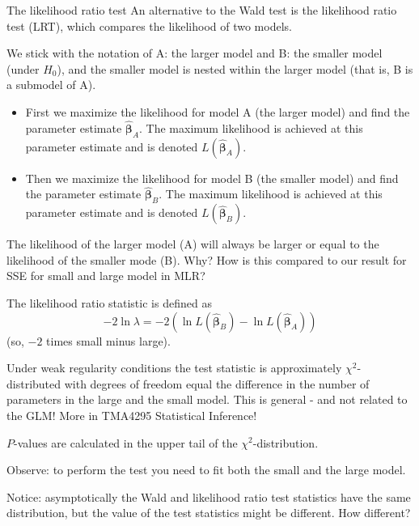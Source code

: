 \documentclass[
  ignorenonframetext,
]{beamer}
\providecommand{\tightlist}{%
  \setlength{\itemsep}{0pt}\setlength{\parskip}{0pt}}
\begin{document}
\begin{frame}
\begin{block}{The likelihood ratio test}
\protect\hypertarget{the-likelihood-ratio-test}{}
An alternative to the Wald test is the likelihood ratio test (LRT),
which compares the likelihood of two models.

We stick with the notation of A: the larger model and B: the smaller
model (under \(H_0\)), and the smaller model is nested within the larger
model (that is, B is a submodel of A).

\begin{itemize}
\tightlist
\item
  First we maximize the likelihood for model A (the larger model) and
  find the parameter estimate \(\hat{\boldsymbol{\beta}}_A\). The
  maximum likelihood is achieved at this parameter estimate and is
  denoted \(L(\hat{\boldsymbol{\beta}}_A)\).
\item
  Then we maximize the likelihood for model B (the smaller model) and
  find the parameter estimate \(\hat{\boldsymbol{\beta}}_B\). The
  maximum likelihood is achieved at this parameter estimate and is
  denoted \(L(\hat{\boldsymbol{\beta}}_B)\).
\end{itemize}
\end{block}
\end{frame}

\begin{frame}
The likelihood of the larger model (A) will always be larger or equal to
the likelihood of the smaller mode (B). Why? How is this compared to our
result for SSE for small and large model in MLR?

The likelihood ratio statistic is defined as
\[- 2\ln \lambda=-2(\ln L(\hat{\boldsymbol{\beta}}_B)-\ln L(\hat{\boldsymbol{\beta}}_A)) \]
(so, \(-2\) times small minus large).
\end{frame}

\begin{frame}
Under weak regularity conditions the test statistic is approximately
\(\chi^2\)-distributed with degrees of freedom equal the difference in
the number of parameters in the large and the small model. This is
general - and not related to the GLM! More in TMA4295 Statistical
Inference!

\(P\)-values are calculated in the upper tail of the
\(\chi^2\)-distribution.

Observe: to perform the test you need to fit both the small and the
large model.

Notice: asymptotically the Wald and likelihood ratio test statistics
have the same distribution, but the value of the test statistics might
be different. How different?
\end{frame}
\end{document}
